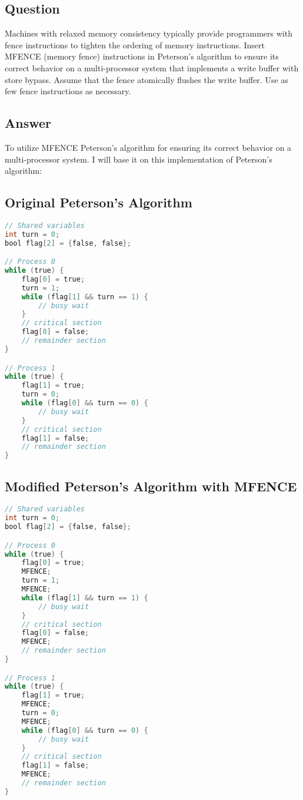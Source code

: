 \documentclass{article}
\begin{document}
\subsection*{Question}
Machines with relaxed memory consistency typically provide programmers with fence instructions to tighten the ordering of memory instructions. Insert MFENCE (memory fence) instructions in Peterson’s algorithm to ensure its correct behavior on a multi-processor system that implements a write buffer with store bypass. Assume that the fence atomically flushes the write buffer. Use as few fence instructions as necessary.

\subsection*{Answer}

To utilize MFENCE Peterson's algorithm for ensuring its correct behavior on a multi-processor system. I will base it on this implementation of Peterson's algorithm:

\subsection*{Original Peterson's Algorithm}

\begin{lstlisting}[language=C]
// Shared variables
int turn = 0;
bool flag[2] = {false, false};

// Process 0
while (true) {
    flag[0] = true;
    turn = 1;
    while (flag[1] && turn == 1) {
        // busy wait
    }
    // critical section
    flag[0] = false;
    // remainder section
}

// Process 1
while (true) {
    flag[1] = true;
    turn = 0;
    while (flag[0] && turn == 0) {
        // busy wait
    }
    // critical section
    flag[1] = false;
    // remainder section
}
\end{lstlisting}

\subsection*{Modified Peterson's Algorithm with MFENCE}

\begin{lstlisting}[language=C]
// Shared variables
int turn = 0;
bool flag[2] = {false, false};

// Process 0
while (true) {
    flag[0] = true;
    MFENCE;
    turn = 1;  
    MFENCE;             
    while (flag[1] && turn == 1) {
        // busy wait
    }
    // critical section
    flag[0] = false;        
    MFENCE;                  
    // remainder section
}

// Process 1
while (true) {
    flag[1] = true;         
    MFENCE;               
    turn = 0;            
    MFENCE;                 
    while (flag[0] && turn == 0) {
        // busy wait
    }
    // critical section
    flag[1] = false;      
    MFENCE;             
    // remainder section
}
\end{lstlisting}
\end{document}
